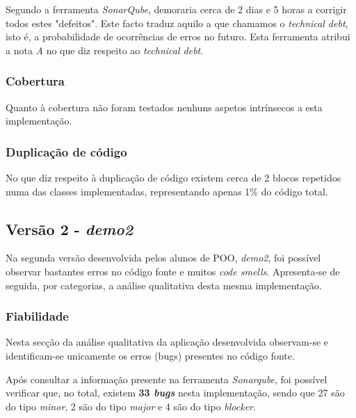 \documentclass[a4paper]{report}
\begin{document}
Segundo a ferramenta \textit{SonarQube}, demoraria cerca de 2 dias e 5 horas a corrigir todos estes "defeitos". Este facto traduz aquilo a que chamamos o \textit{technical debt}, isto é, a probabilidade de ocorrências de erros no futuro. Esta ferramenta atribui a nota \textit{A} no que diz respeito ao \textit{technical debt}.

\subsubsection{Cobertura}
Quanto à cobertura não foram testados nenhuns aspetos intrínsecos a esta implementação.

\subsubsection{Duplicação de código}
No que diz respeito à duplicação de código existem cerca de 2 blocos repetidos numa das classes implementadas, representando apenas 1\% do código total.

\subsection{Versão 2 - \textit{demo2}}
Na segunda versão desenvolvida pelos alunos de POO, \textit{demo2}, foi possível observar bastantes erros no código fonte e muitos \textit{code smells}. Apresenta-se de seguida, por categorias, a análise qualitativa desta mesma implementação.

\subsubsection{Fiabilidade}
Nesta secção da análise qualitativa da aplicação desenvolvida observam-se e identificam-se unicamente os erros (bugs) presentes no código fonte.

Após consultar a informação presente na ferramenta \textit{Sonarqube}, foi possível verificar que, no total, existem \textbf{33 \textit{bugs}} nesta implementação, sendo que 27 são do tipo \textit{minor}, 2 são do tipo \textit{major} e 4 são do tipo \textit{blocker}.
\end{document}
